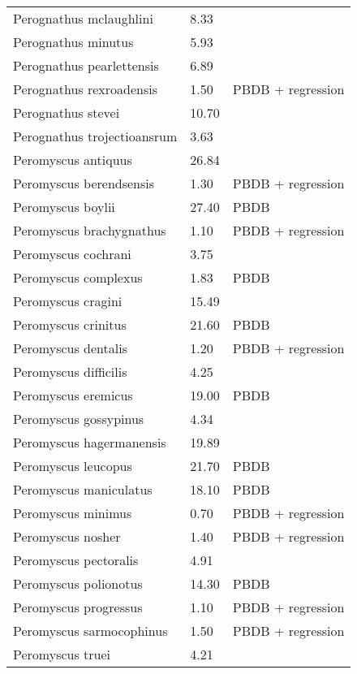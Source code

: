 \begin{longtable}{p{} p{} p{}}
    Perognathus mclaughlini & 8.33 & \cite{Tomiya2013} \\ 
    Perognathus minutus & 5.93 & \cite{Tomiya2013} \\ 
    Perognathus pearlettensis & 6.89 & \cite{Tomiya2013} \\ 
    Perognathus rexroadensis & 1.50 & PBDB + regression \\ 
    Perognathus stevei & 10.70 & \cite{Tomiya2013} \\ 
    Perognathus trojectioansrum & 3.63 & \cite{Tomiya2013} \\ 
    Peromyscus antiquus & 26.84 & \cite{Tomiya2013} \\ 
    Peromyscus berendsensis & 1.30 & PBDB + regression \\ 
    Peromyscus boylii & 27.40 & PBDB \\ 
    Peromyscus brachygnathus & 1.10 & PBDB + regression \\ 
    Peromyscus cochrani & 3.75 & \cite{Smith2004} \\ 
    Peromyscus complexus & 1.83 & PBDB \\ 
    Peromyscus cragini & 15.49 & \cite{Tomiya2013} \\ 
    Peromyscus crinitus & 21.60 & PBDB \\ 
    Peromyscus dentalis & 1.20 & PBDB + regression \\ 
    Peromyscus difficilis & 4.25 & \cite{Smith2004} \\ 
    Peromyscus eremicus & 19.00 & PBDB \\ 
    Peromyscus gossypinus & 4.34 & \cite{Smith2004} \\ 
    Peromyscus hagermanensis & 19.89 & \cite{Tomiya2013} \\ 
    Peromyscus leucopus & 21.70 & PBDB \\ 
    Peromyscus maniculatus & 18.10 & PBDB \\ 
    Peromyscus minimus & 0.70 & PBDB + regression \\ 
    Peromyscus nosher & 1.40 & PBDB + regression \\ 
    Peromyscus pectoralis & 4.91 & \cite{Smith2004} \\ 
    Peromyscus polionotus & 14.30 & PBDB \\ 
    Peromyscus progressus & 1.10 & PBDB + regression \\ 
    Peromyscus sarmocophinus & 1.50 & PBDB + regression \\ 
    Peromyscus truei & 4.21 & \cite{Smith2004} \\ 

\end{longtable}
